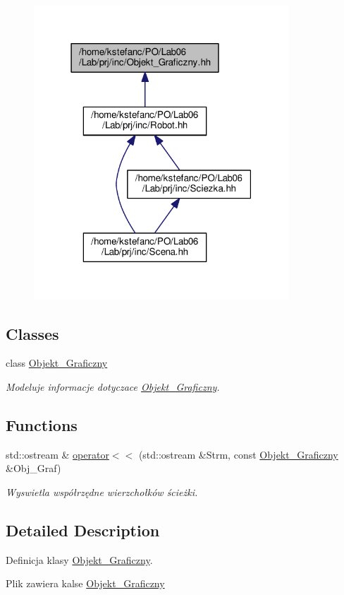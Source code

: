 \begin{figure}[H]
\begin{center}
\leavevmode
\includegraphics[width=271pt]{_objekt___graficzny_8hh__dep__incl}
\end{center}
\end{figure}
\subsection*{Classes}
\begin{DoxyCompactItemize}
\item 
class \hyperlink{class_objekt___graficzny}{Objekt\+\_\+\+Graficzny}
\begin{DoxyCompactList}\small\item\em Modeluje informacje dotyczace \hyperlink{class_objekt___graficzny}{Objekt\+\_\+\+Graficzny}. \end{DoxyCompactList}\end{DoxyCompactItemize}
\subsection*{Functions}
\begin{DoxyCompactItemize}
\item 
\hypertarget{_objekt___graficzny_8hh_a43ce12bd48e47ba41645772340e7103b}{std\+::ostream \& \hyperlink{_objekt___graficzny_8hh_a43ce12bd48e47ba41645772340e7103b}{operator$<$$<$} (std\+::ostream \&Strm, const \hyperlink{class_objekt___graficzny}{Objekt\+\_\+\+Graficzny} \&Obj\+\_\+\+Graf)}\label{_objekt___graficzny_8hh_a43ce12bd48e47ba41645772340e7103b}

\begin{DoxyCompactList}\small\item\em Wyswietla współrzędne wierzchołków ścieżki. \end{DoxyCompactList}\end{DoxyCompactItemize}


\subsection{Detailed Description}
Definicja klasy \hyperlink{class_objekt___graficzny}{Objekt\+\_\+\+Graficzny}. 

Plik zawiera kalse \hyperlink{class_objekt___graficzny}{Objekt\+\_\+\+Graficzny} 